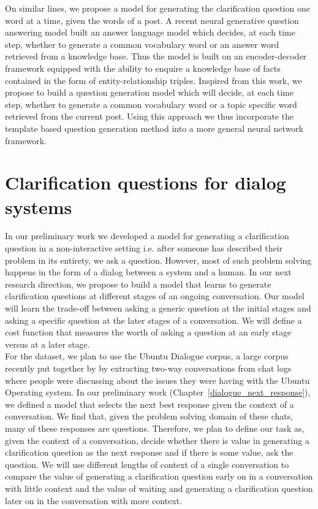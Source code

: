 \documentclass[11pt]{report}
\renewcommand\cite{\citep}	%
\begin{document}
\noindent
On similar lines, we propose a model for generating the clarification question one word at a time, given the words of a post. A recent neural generative question answering model \cite{yin2016neural} built an answer language model which decides, at each time step, whether to generate a common vocabulary word or an answer word retrieved from a knowledge base. Thus the model is built on an encoder-decoder framework equipped with the ability to enquire a knowledge base of facts contained in the form of entity-relationship triples. Inspired from this work, we propose to build a question generation model which will decide, at each time step, whether to generate a common vocabulary word or a topic specific word retrieved from the current post. Using this approach we thus incorporate the template based question generation method into a more general neural network framework.

\section{Clarification questions for dialog systems}

In our preliminary work we developed a model for generating a clarification question in a non-interactive setting i.e. after someone has described their problem in its entirety, we ask a question. However, most of such problem solving happens in the form of a dialog between a system and a human. In our next research direction, we propose to build a model that learns to generate  clarification questions at different stages of an ongoing conversation. Our model will learn the trade-off between asking a generic question at the initial stages and asking a specific question at the later stages of a conversation. We will define a cost function that measures the worth of asking a question at an early stage versus at a later stage. \\

\noindent
For the dataset, we plan to use the Ubuntu Dialogue corpus, a large corpus recently put together by \cite{lowe2015ubuntu} by extracting two-way conversations from chat logs where people were discussing about the issues they were having with the Ubuntu Operating system. In our preliminary work (Chapter~\ref{dialogue_next_response}), we defined a model that selects the next best response given the context of a conversation. We find that, given the problem solving domain of these chats, many of these responses are questions. Therefore, we plan to define our task as, given the context of a conversation, decide whether there is value in generating a clarification question as the next response and if there is some value, ask the question. We will use different lengths of context of a single conversation to compare the value of generating a clarification question early on in a conversation with little context and the value of waiting and generating a clarification question later on in the conversation with more context. 
\end{document}
